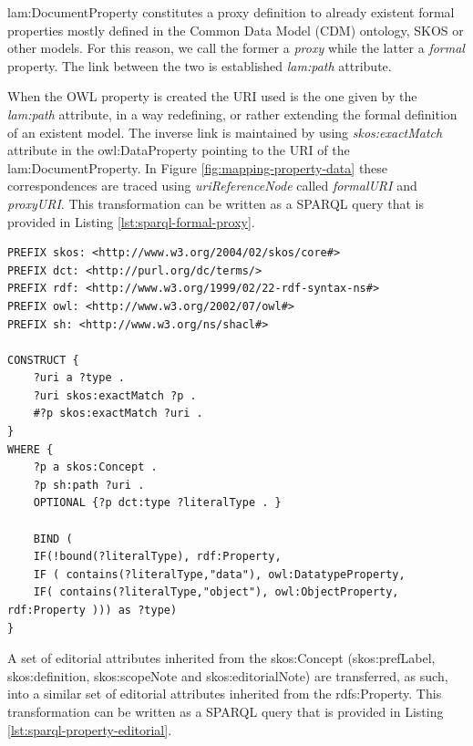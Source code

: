 	lam:DocumentProperty constitutes a proxy definition to already existent formal properties mostly defined in the Common Data Model (CDM) ontology, SKOS or other models. For this reason, we call the former a \textit{proxy} while the latter a \textit{formal} property. The link between the two is established \textit{lam:path} attribute. 

	When the OWL property is created the URI used is the one given by the \textit{lam:path} attribute, in a way redefining, or rather extending the formal definition of an existent model. The inverse link is maintained by using \textit{skos:exactMatch} attribute in the owl:DataProperty pointing to the URI of the lam:DocumentProperty. In Figure \ref{fig:mapping-property-data} these correspondences are traced using \textit{uriReferenceNode} called \textit{formalURI} and \textit{proxyURI}. This transformation can be written as a SPARQL query that is provided in Listing \ref{lst:sparql-formal-proxy}. 
	
\begin{lstlisting}[language=SPARQL, captionpos=b, caption={The transformation SPARQL query for property formal definition}, label=lst:sparql-formal-proxy]
PREFIX skos: <http://www.w3.org/2004/02/skos/core#>
PREFIX dct: <http://purl.org/dc/terms/>
PREFIX rdf: <http://www.w3.org/1999/02/22-rdf-syntax-ns#>
PREFIX owl: <http://www.w3.org/2002/07/owl#>
PREFIX sh: <http://www.w3.org/ns/shacl#>

CONSTRUCT { 
	?uri a ?type .
	?uri skos:exactMatch ?p .
	#?p skos:exactMatch ?uri .
} 
WHERE { 
	?p a skos:Concept .
	?p sh:path ?uri .
	OPTIONAL {?p dct:type ?literalType . }  
	
	BIND ( 
	IF(!bound(?literalType), rdf:Property,    
	IF ( contains(?literalType,"data"), owl:DatatypeProperty,
	IF( contains(?literalType,"object"), owl:ObjectProperty, rdf:Property ))) as ?type)
}
\end{lstlisting}

	A set of editorial attributes inherited from the skos:Concept (skos:prefLabel, skos:definition, skos:scopeNote and skos:editorialNote) are transferred, as such, into a similar set of editorial attributes inherited from the rdfs:Property. This transformation can be written as a SPARQL query that is provided in Listing \ref{lst:sparql-property-editorial}.
	
